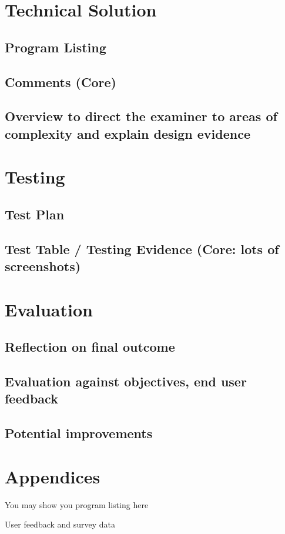 \documentclass[titlepage]{article}
\let\Oldsection\section{}
\renewcommand{\section}{\FloatBarrier\Oldsection}
\let\Oldsubsection\subsection{}
\renewcommand{\subsection}{\FloatBarrier\Oldsubsection}
\begin{document}
\textbf{\color{red}{I have no idea what this means.
All I can find is that it relates to database structure???}}

\section{Technical Solution}

\subsection{Program Listing} 
\subsection{Comments (Core)}

\subsection{Overview to direct the examiner to areas of complexity and explain design evidence}

\section{Testing}

\subsection{Test Plan}

\subsection{Test Table / Testing Evidence (Core: lots of screenshots)}

\section{Evaluation}

\subsection{Reflection on final outcome}

\subsection{Evaluation against objectives, end user feedback}

\subsection{Potential improvements}

\section{Appendices}

You may show you program listing here

User feedback and survey data

\clearpage
\printnoidxglossaries{}
\end{document}
